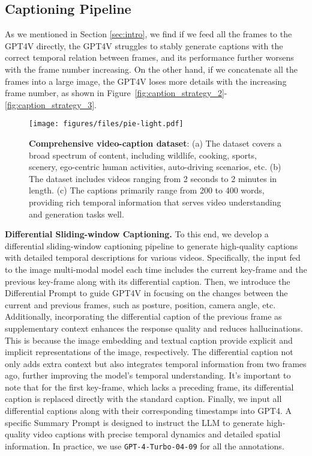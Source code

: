 \subsection{Captioning Pipeline}
\label{sec:captioning}
As we mentioned in Section \ref{sec:intro}, we find if we feed all the frames to the GPT4V directly, the GPT4V struggles to stably generate captions with the correct temporal relation between frames, and its performance further worsens with the frame number increasing. On the other hand, if we concatenate all the frames into a large image, the GPT4V loses more details with the increasing frame number, as shown in Figure~\ref{fig:caption_strategy_2}-\ref{fig:caption_strategy_3}. 

\begin{figure*}[!t]
    \centering
    \texttt{[image: figures/files/pie-light.pdf]}
    \vspace{-2mm}
    \caption{\textbf{Comprehensive video-caption dataset}: (a) The dataset covers a broad spectrum of content, including wildlife, cooking, sports, scenery, ego-centric human activities, auto-driving scenarios, etc. 
    (b) The dataset includes videos ranging from 2 seconds to 2 minutes in length.
    (c) The captions primarily range from 200 to 400 words, providing rich temporal information that serves video understanding and generation tasks well.}
    \label{fig:data-pie}
    \vspace{-5mm}
\end{figure*}\textbf{Differential Sliding-window Captioning.} 
To this end, we develop a differential sliding-window captioning pipeline to generate high-quality captions with detailed temporal descriptions for various videos. Specifically, the input fed to the image multi-modal model each time includes the current key-frame and the previous key-frame along with its differential caption. Then, we introduce the Differential Prompt to guide GPT4V in focusing on the changes between the current and previous frames, such as posture, position, camera angle, etc. Additionally, incorporating the differential caption of the previous frame as supplementary context enhances the response quality and reduces hallucinations. This is because the image embedding and textual caption provide explicit and implicit representations of the image, respectively. The differential caption not only adds extra context but also integrates temporal information from two frames ago, further improving the model's temporal understanding. It's important to note that for the first key-frame, which lacks a preceding frame, its differential caption is replaced directly with the standard caption. Finally, we input all differential captions along with their corresponding timestamps into GPT4. A specific Summary Prompt is designed to instruct the LLM to generate high-quality video captions with precise temporal dynamics and detailed spatial information. In practice, we use \texttt{GPT-4-Turbo-04-09} for all the annotations.

